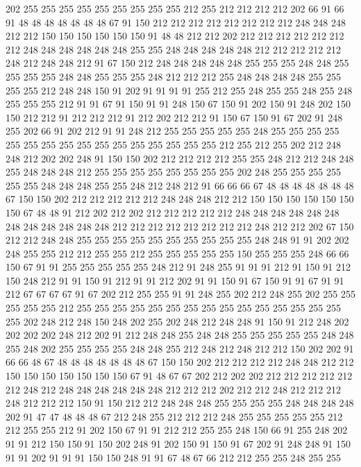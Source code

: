 202 255 255 255 255 255 255 255 255 255 212 255 212 212 212 212 202 66 91 66
91 48 48 48 48 48 48 48 67 91 150 212 212 212 212 212 212 212 212 248
248 248 212 212 150 150 150 150 150 150 91 48 48 212 212 202 212 212 212 212
212 212 212 248 248 248 248 248 248 255 255 248 248 248 248 248 212 212 212 212
212 248 212 248 248 212 91 67 150 212 248 248 248 248 248 255 255 255 248 248
255 255 255 255 248 248 255 255 255 248 212 212 212 255 248 248 248 248 255 255
255 255 212 248 248 150 91 202 91 91 91 91 255 212 255 248 255 255 248 255
248 255 255 255 212 91 91 67 91 150 91 91 248 150 67 150 91 202 150 91
248 202 150 150 212 212 91 212 212 212 91 212 202 212 212 91 150 67 150 91
67 202 91 248 255 202 66 91 202 212 91 91 248 212 255 255 255 255 255 248
255 255 255 255 255 255 255 255 255 255 255 255 255 255 255 255 212 255 212 255
202 212 248 248 212 202 202 248 91 150 150 202 212 212 212 212 255 255 248 212
212 248 248 255 248 248 248 212 255 255 255 255 255 255 255 255 202 248 255 255
255 255 255 255 248 248 248 255 255 248 212 248 212 91 66 66 66 67 48 48
48 48 48 48 48 67 150 150 202 212 212 212 212 212 248 248 248 212 212 150
150 150 150 150 150 150 67 48 48 91 212 202 212 202 212 212 212 212 212 248
248 248 248 248 248 248 248 248 248 248 248 212 212 212 212 212 212 212 212 248
212 212 202 67 150 212 212 248 248 255 255 255 255 255 255 255 255 255 255 248
248 91 91 202 202 248 255 255 212 212 255 255 212 255 255 255 255 255 150 255
255 255 248 66 66 150 67 91 91 255 255 255 255 255 248 212 91 248 255 91
91 91 212 91 150 91 212 150 248 212 91 91 150 91 212 91 91 212 202 91
91 150 91 67 150 91 91 67 91 91 212 67 67 67 67 91 67 202 212 255
255 91 91 248 255 202 212 248 255 202 255 255 255 255 255 212 255 255 255 255
255 255 255 255 255 255 255 255 255 255 255 255 202 248 212 248 150 248 202 255
202 248 212 248 248 91 150 91 212 248 202 202 202 202 248 212 202 91 212 248
248 255 248 248 255 255 255 255 255 248 248 255 248 202 255 255 255 255 248 248
255 212 248 212 248 212 212 150 202 202 91 66 66 48 67 48 48 48 48 48
48 48 67 150 150 202 212 212 212 212 248 248 212 212 150 150 150 150 150 150
150 67 91 48 67 67 202 212 202 202 212 212 212 212 212 212 248 212 248 248
248 248 248 248 212 212 212 202 212 212 248 212 212 212 248 212 212 212 150 91
150 212 212 248 248 248 255 255 255 255 248 248 248 248 202 91 47 47 48 48
48 67 212 248 255 212 212 212 248 255 255 255 255 255 212 212 255 255 212 91
202 150 67 91 91 212 212 255 255 248 150 66 91 255 248 202 91 91 212 150
150 91 150 202 248 91 202 150 91 150 91 67 202 91 248 248 91 150 91 91
202 91 91 91 150 150 248 91 91 67 48 67 66 212 212 255 255 248 255 255
